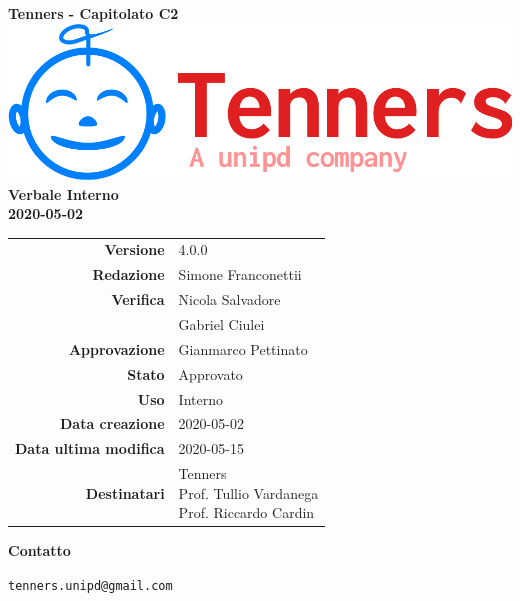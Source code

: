 \begin{titlepage}
	\begin{center}
		\large \textbf{Tenners - Capitolato C2}
		\vfill
		\includegraphics[scale = 0.3]{./res/img/logo.png}\\
		\vfill
		\Huge \textbf{Verbale Interno} \\
		\textbf {2020-05-02}

        \vfill
        \large

        \begin{tabular}{r|l}
                        \textbf{Versione} & 4.0.0 \\
                        \textbf{Redazione} & Simone Franconettii \\
                        \textbf{Verifica} & Nicola Salvadore\\&
                        Gabriel Ciulei\\
                        \textbf{Approvazione} & Gianmarco Pettinato  \\
                        \textbf{Stato} & Approvato \\
                        \textbf{Uso} &  Interno\\
                        \textbf{Data creazione} &  2020-05-02\\
                        \textbf{Data ultima modifica} &  2020-05-15\\
                        \textbf{Destinatari} & \parbox[t]{5cm}{Tenners \\ Prof. Tullio Vardanega\\ Prof. Riccardo Cardin}
                \end{tabular}
                \vfill
                \normalsize
                \vfill
                \textbf{Contatto}

                \texttt{tenners.unipd@gmail.com}

	\end{center}
\end{titlepage}
